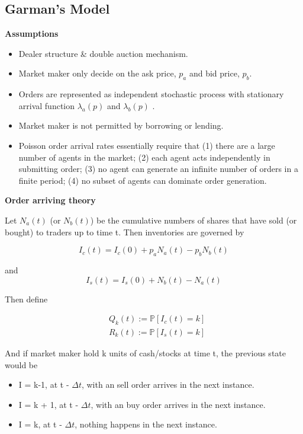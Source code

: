 \documentclass[a4]{article}
\begin{document}
\subsection{Garman's Model}
\textbf{Assumptions}
\begin{itemize}
	\item Dealer structure \& double auction mechanism.
	\item Market maker only decide on the ask price, $p_{a}$ and bid price, $p_{b}$.
	\item Orders are represented as independent stochastic process with stationary arrival function $\lambda _{a}(p)$  and $\lambda _{b}(p)$ .
	\item Market maker is not permitted by borrowing or lending.
	\item Poisson order arrival rates essentially require that (1) there are a large number of agents in the market; (2) each agent acts independently in submitting order; (3) no agent can generate an infinite number of orders in a finite period; (4) no subset of agents can dominate order generation.
\end{itemize}
\textbf{Order arriving theory}\par
\bigbreak 
Let $N_{a}(t)$ (or $N_{b}(t)$) be the cumulative numbers of shares that have sold (or bought) to traders up to time t. Then inventories are governed by\par 
$$
I_{c}(t) = I_{c}(0) + p_{a}N_{a}(t) - p_{b}N_{b}(t)
$$\par 
and 
$$
I_{s}(t) = I_{s}(0) + N_{b}(t) - N_{a}(t)
$$\par  
Then define\par 
$$
\begin{aligned}
&Q_{k}(t) := \mathbb{P}[I_{c}(t)=k]\\
&R_{k}(t) :=\mathbb{P}[ I_{s}(t)=k]
\end{aligned}
$$\par 
And if market maker hold k units of cash/stocks at time t, the previous state would be\par 
\begin{itemize}
	\item I = k-1, at t - $\Delta t$, with an sell order arrives in the next instance.
	\item I = k + 1, at t - $\Delta t$, with an buy order arrives in the next instance.
	\item I = k, at t - $\Delta t$, nothing happens in the next instance.
\end{itemize}\par 
\end{document}
